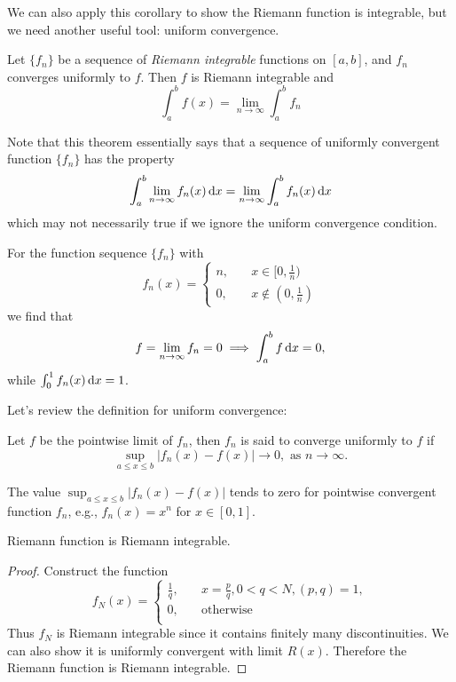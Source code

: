 We can also apply this corollary to show the Riemann function is integrable, but we need another useful tool: uniform convergence.
\begin{theorem}
Let $\{f_n\}$ be a sequence of \emph{Riemann integrable} functions on $[a,b]$, and $f_n$ converges uniformly to $f$. Then $f$ is Riemann integrable and 
\[
\int_a^bf(x)=\lim_{n\to\infty}\int_a^bf_n
\]
\end{theorem}
\begin{remark}
Note that this theorem essentially says that a sequence of uniformly convergent function $\{f_n\}$ has the property
\[
\int_a^b\lim_{n\to\infty}f_n(x)\,\mathrm{d} x=\lim_{n\to\infty}\int_a^bf_n(x)\,\mathrm{d} x
\]
which may not necessarily true if we ignore the uniform convergence condition. 
\end{remark}
\begin{example}
For the function sequence $\{f_n\}$ with
 \[
f_n(x)=\left\{
\begin{aligned}
n,&\quad x\in[0,\frac{1}{n})\\
0,&\quad x\notin(0,\frac{1}{n})
\end{aligned}
\right.
\]
we find that 
\[
f=\lim_{n\to\infty}f_n=0\implies
\int_a^b f\,\mathrm{d} x=0,
\]
while $\int_0^1f_n(x)\,\mathrm{d} x=1$.
\end{example}
Let's review the definition for uniform convergence:
\begin{definition}
Let $f$ be the pointwise limit of $f_n$, then $f_n$ is said to converge uniformly to $f$ if 
\[
\sup_{a\le x\le b}|f_n(x) - f(x)|\to0,\mbox{ as }n\to\infty.
\]
\end{definition}
\begin{remark}
The value $\sup_{a\le x\le b}|f_n(x) - f(x)|$ tends to zero for pointwise convergent function $f_n$, e.g., $f_n(x) = x^n$ for $x\in[0,1]$.
\end{remark}

\begin{corollary}
Riemann function is Riemann integrable.
\end{corollary}
\begin{proof}
Construct the function
\[
f_N(x)=\left\{
\begin{aligned}
\frac{1}{q},&\quad x=\frac{p}{q}, 0<q<N, (p,q)=1,\\
0,&\quad \mbox{otherwise}\\
\end{aligned}
\right.
\]
Thus $f_N$ is Riemann integrable since it contains finitely many discontinuities. We can also show it is uniformly convergent with limit $R(x).$ Therefore the Riemann function is Riemann integrable.
\end{proof}












